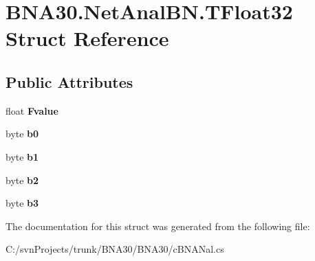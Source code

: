 \hypertarget{struct_b_n_a30_1_1_net_anal_b_n_1_1_t_float32}{}\section{B\+N\+A30.\+Net\+Anal\+B\+N.\+T\+Float32 Struct Reference}
\label{struct_b_n_a30_1_1_net_anal_b_n_1_1_t_float32}
\subsection*{Public Attributes}
\begin{DoxyCompactItemize}
\item 
\mbox{\label{struct_b_n_a30_1_1_net_anal_b_n_1_1_t_float32_a2785557e136912d1a9c80f9c514d4fd7}} 
float {\bfseries Fvalue}
\item 
\mbox{\label{struct_b_n_a30_1_1_net_anal_b_n_1_1_t_float32_aab25c3b9a32273c9d045653bbe7357af}} 
byte {\bfseries b0}
\item 
\mbox{\label{struct_b_n_a30_1_1_net_anal_b_n_1_1_t_float32_ad5f274b53335967eae0aa3d694262c52}} 
byte {\bfseries b1}
\item 
\mbox{\label{struct_b_n_a30_1_1_net_anal_b_n_1_1_t_float32_a584fea4fbcff534303a26ce1735c367d}} 
byte {\bfseries b2}
\item 
\mbox{\label{struct_b_n_a30_1_1_net_anal_b_n_1_1_t_float32_a60ff806818c1dc6898dc50ff78d4736f}} 
byte {\bfseries b3}
\end{DoxyCompactItemize}


The documentation for this struct was generated from the following file\+:\begin{DoxyCompactItemize}
\item 
C\+:/svn\+Projects/trunk/\+B\+N\+A30/\+B\+N\+A30/c\+B\+N\+A\+Nal.\+cs\end{DoxyCompactItemize}
